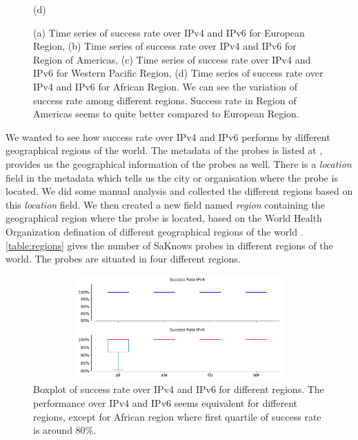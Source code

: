 \begin{figure}[!ht]
\begin{minipage}{0.5\textwidth}
		\caption[Time series of success rate over IPv4 and IPv6 for African Region]{(d)}
	\end{minipage}
	\caption[Timeseries of Success rate over IPv4 and IPv6 for different regions]{(a) Time series of success rate over IPv4 and IPv6 for European Region, (b) Time series of success rate over IPv4 and IPv6 for Region of Americas,
(c) Time series of success rate over IPv4 and IPv6 for Western Pacific Region, (d) Time series of success rate over IPv4 and IPv6 for African Region. We can see the variation of success rate among different regions. Success rate in Region of Americas seems to quite better compared to European Region.}
	\label{fig:Timeseries of Success rate over IPv4 and IPv6 for different regions}
\end{figure}
We wanted to see how success rate over IPv4 and IPv6 performs by different geographical regions of the world. The metadata of the probes is listed at \cite{metadata}, 
provides us the geographical information of the probes as well.
There is a \textit{location} field in the metadata which tells us the city or organisation where the probe is located. We did some manual analysis and collected the 
different regions based on this \textit{location} field.
We then created a new field named \textit{region} containing the geographical region where the probe is located, based on the World Health Organization defination of 
different geographical regions of the world \cite{whoregions}.
\cref{table:regions} gives the number of SaKnows probes in different regions of the world. The probes are situated in four different regions. 
\begin{figure}[!ht]
	\centering
	\includegraphics[keepaspectratio, height=4cm, width=15cm]{figures/success/netflix-success-rate-boxplot-region.pdf}
	\caption[Success Rate Boxplot for different Regions]{Boxplot of success rate over IPv4 and IPv6 for different regions. The performance over IPv4 and IPv6 seems equivalent for different regions, except for African region where first quartile of success rate is around 80\%. }
	\label{fig:Success Rate Boxplot for Different Regions}
\end{figure}
